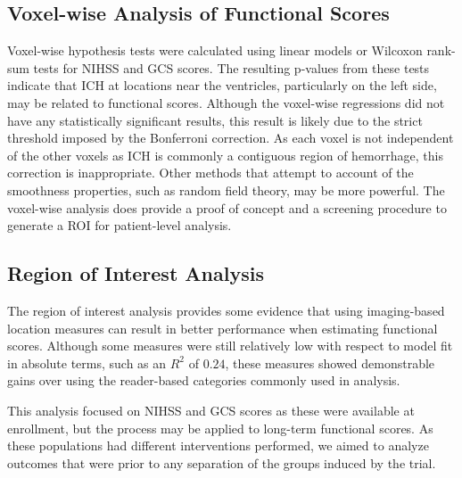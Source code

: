 \documentclass[10pt]{article}\usepackage[]{graphicx}\usepackage[]{color}
\begin{document}
 



\subsection*{Voxel-wise Analysis of Functional Scores}

Voxel-wise hypothesis tests were calculated using linear models or Wilcoxon rank-sum tests for NIHSS and GCS scores.  The resulting p-values from these tests indicate that ICH at locations near the ventricles, particularly on the left side, may be related to functional scores.  Although the voxel-wise regressions did not have any statistically significant results, this result is likely due to the strict threshold imposed by the Bonferroni correction.  As each voxel is not independent of the other voxels as ICH is commonly a contiguous region of hemorrhage, this correction is inappropriate.  Other methods that attempt to account of the smoothness properties, such as random field theory, may be more powerful.  The voxel-wise analysis does provide a proof of concept and a screening procedure to generate a ROI for patient-level analysis.

\subsection*{Region of Interest Analysis}

The region of interest analysis provides some evidence that using imaging-based location measures can result in better performance when estimating functional scores.  Although some measures were still relatively low with respect to model fit in absolute terms, such as an $R^2$ of $0.24$, these measures showed demonstrable gains over using the reader-based categories commonly used in analysis.

This analysis focused on NIHSS and GCS scores as these were available at enrollment, but the process may be applied to long-term functional scores.  As these populations had different interventions performed, we aimed to analyze outcomes that were prior to any separation of the groups induced by the trial.  
\end{document}
